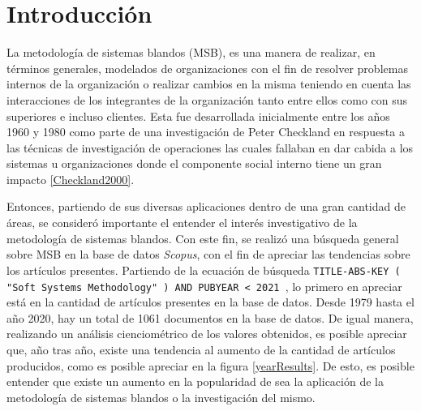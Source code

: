 \documentclass[10pt,letterpaper,twoside,twocolumn]{article}   %
\begin{document}
\thispagestyle{Primera_Pagina}

\section{Introducción}
La metodología de sistemas blandos (MSB), es una manera de realizar, en términos generales, modelados de organizaciones con el fin de resolver problemas internos de la organización o realizar cambios en la misma teniendo en cuenta las interacciones de los integrantes de la organización tanto entre ellos como con sus superiores e incluso clientes. Esta fue desarrollada inicialmente entre los años 1960 y 1980 como parte de una investigación de Peter Checkland en respuesta a las técnicas de investigación de operaciones las cuales fallaban en dar cabida a los sistemas u organizaciones donde el componente social interno tiene un gran impacto \ref{Checkland2000}. 

Entonces, partiendo de sus diversas aplicaciones dentro de una gran cantidad de áreas, se consideró importante el entender el interés investigativo de la metodología de sistemas blandos. Con este fin, se realizó una búsqueda general sobre MSB en la base de datos \textit{Scopus}, con el fin de apreciar las tendencias sobre los artículos presentes. Partiendo de la ecuación de búsqueda \texttt{TITLE-ABS-KEY ( "Soft Systems Methodology" )  AND  PUBYEAR  <  2021 }, lo primero en apreciar está en la cantidad de artículos presentes en la base de datos. Desde 1979 hasta el año 2020, hay un total de 1061 documentos en la base de datos. De igual manera, realizando un análisis cienciométrico de los valores obtenidos, es posible apreciar que, año tras año, existe una tendencia al aumento de la cantidad de artículos producidos, como es posible apreciar en la figura \ref{yearResults}. De esto, es posible entender que existe un aumento en la popularidad de sea la aplicación de la metodología de sistemas blandos o la investigación del mismo.
\end{document}
